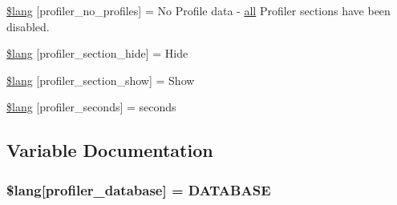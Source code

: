 \begin{DoxyCompactItemize}
\hyperlink{system_2language_2english_2profiler__lang_8php_aabea841eed12fa8271f13656fa7d5457}{\$lang} \mbox{[}\textquotesingle{}profiler\+\_\+no\+\_\+profiles\textquotesingle{}\mbox{]} = \textquotesingle{}No Profile data -\/ \hyperlink{change_team_8php_a5f3fcf87333f5770d16608f67ad88d19}{all} Profiler sections have been disabled.\textquotesingle{}
\item 
\hyperlink{system_2language_2english_2profiler__lang_8php_a137158ebe1d58bd53bbbb4594f2bc0ed}{\$lang} \mbox{[}\textquotesingle{}profiler\+\_\+section\+\_\+hide\textquotesingle{}\mbox{]} = \textquotesingle{}Hide\textquotesingle{}
\item 
\hyperlink{system_2language_2english_2profiler__lang_8php_a3e3b1984f57780efbdaf6d01dac31f3c}{\$lang} \mbox{[}\textquotesingle{}profiler\+\_\+section\+\_\+show\textquotesingle{}\mbox{]} = \textquotesingle{}Show\textquotesingle{}
\item 
\hyperlink{system_2language_2english_2profiler__lang_8php_a6d6060d6ca0da3c1e6d4168914d7e362}{\$lang} \mbox{[}\textquotesingle{}profiler\+\_\+seconds\textquotesingle{}\mbox{]} = \textquotesingle{}seconds\textquotesingle{}
\end{DoxyCompactItemize}


\subsection{Variable Documentation}
\hypertarget{system_2language_2english_2profiler__lang_8php_a93beea1bc75788ad2b7d3d3895984282}{}
\subsubsection[{\$lang}]{\setlength{\rightskip}{0pt plus 5cm}\$lang\mbox{[}\textquotesingle{}profiler\+\_\+database\textquotesingle{}\mbox{]} = \textquotesingle{}D\+A\+T\+A\+B\+A\+S\+E\textquotesingle{}}\label{system_2language_2english_2profiler__lang_8php_a93beea1bc75788ad2b7d3d3895984282}
\hypertarget{system_2language_2english_2profiler__lang_8php_a13e794a194b3fae4ac89472fa90a39a4}{}
